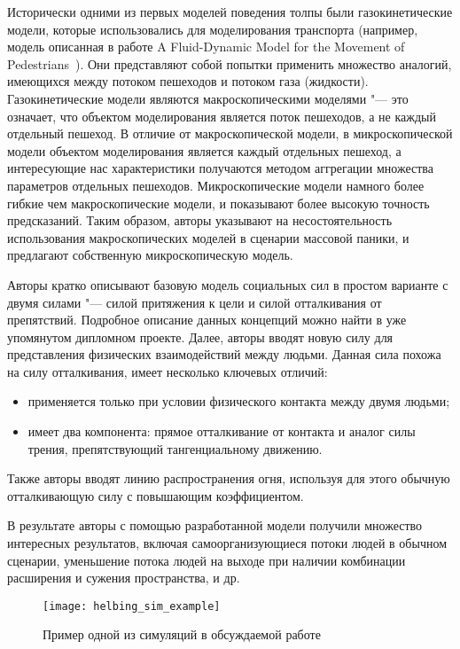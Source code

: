 Исторически одними из первых моделей поведения толпы были газокинетические модели, которые использовались для моделирования транспорта (например, модель описанная в работе A Fluid-Dynamic Model for the Movement of Pedestrians~\cite{helbing_fluid}).
Они представляют собой попытки применить множество аналогий, имеющихся между потоком пешеходов и потоком газа (жидкости).
Газокинетические модели являются макроскопическими моделями "--- это означает, что объектом моделирования является поток пешеходов, а не каждый отдельный пешеход.
В отличие от макроскопической модели, в микроскопической модели объектом моделирования является каждый отдельных пешеход,
а интересующие нас характеристики получаются методом аггрегации множества параметров отдельных пешеходов.
Микроскопические модели намного более гибкие чем макроскопические модели, и показывают более высокую точность предсказаний.
Таким образом, авторы указывают на несостоятельность использования макроскопических моделей в сценарии массовой паники, и предлагают собственную микроскопическую модель.

Авторы кратко описывают базовую модель социальных сил в простом варианте с двумя силами "--- силой притяжения к цели и силой отталкивания от препятствий.
Подробное описание данных концепций можно найти в уже упомянутом дипломном проекте.
Далее, авторы вводят новую силу для представления физических взаимодействий между людьми.
Данная сила похожа на силу отталкивания, имеет несколько ключевых отличий:

\begin{itemize}
  \item применяется только при условии физического контакта между двумя людьми;
  \item имеет два компонента: прямое отталкивание от контакта и аналог силы трения, препятствующий тангенциальному движению.
\end{itemize}

Также авторы вводят линию распространения огня, используя для этого обычную отталкивающую силу с повышающим коэффициентом.

В результате авторы с помощью разработанной модели получили множество интересных результатов, включая самоорганизующиеся потоки людей в обычном сценарии,
уменьшение потока людей на выходе при наличии комбинации расширения и сужения пространства, и др.

\begin{figure}[ht!]
  \centering
  \texttt{[image: helbing\_sim\_example]}
  \caption{Пример одной из симуляций в обсуждаемой работе}
  \label{sub:overview:helbing:sim_example}
\end{figure}


